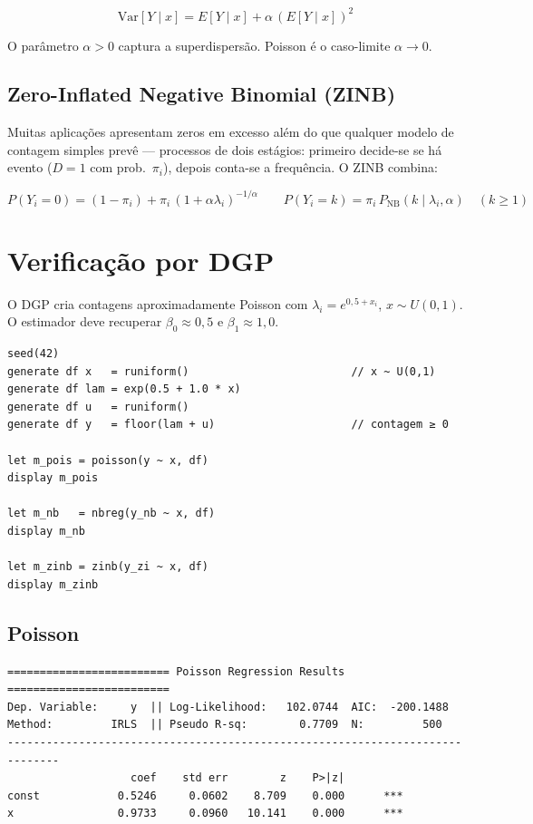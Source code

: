 \[
  \mathrm{Var}[Y \mid x] = E[Y\mid x] + \alpha\,(E[Y\mid x])^2
\]

O parâmetro $\alpha > 0$ captura a superdispersão. Poisson é o caso-limite
$\alpha \to 0$.

\subsection*{Zero-Inflated Negative Binomial (ZINB)}

Muitas aplicações apresentam zeros em excesso além do que qualquer modelo de
contagem simples prevê — processos de dois estágios: primeiro decide-se se há
evento ($D=1$ com prob.\ $\pi_i$), depois conta-se a frequência. O ZINB combina:

\[
  P(Y_i = 0) = (1-\pi_i) + \pi_i\,(1+\alpha\lambda_i)^{-1/\alpha}
  \qquad
  P(Y_i = k) = \pi_i\,P_{\mathrm{NB}}(k \mid \lambda_i,\alpha)\quad (k\geq 1)
\]

\section{Verificação por DGP}

O DGP cria contagens aproximadamente Poisson com $\lambda_i = e^{0{,}5 + x_i}$,
$x \sim U(0,1)$. O estimador deve recuperar $\beta_0 \approx 0{,}5$ e $\beta_1 \approx 1{,}0$.

\begin{lstlisting}[caption={Poisson, NegBin e ZINB}]
seed(42)
generate df x   = runiform()                         // x ~ U(0,1)
generate df lam = exp(0.5 + 1.0 * x)
generate df u   = runiform()
generate df y   = floor(lam + u)                     // contagem ≥ 0

let m_pois = poisson(y ~ x, df)
display m_pois

let m_nb   = nbreg(y_nb ~ x, df)
display m_nb

let m_zinb = zinb(y_zi ~ x, df)
display m_zinb
\end{lstlisting}

\subsection*{Poisson}

\begin{lstlisting}[language={}, basicstyle=\ttfamily\small,
  frame=none, numbers=none, backgroundcolor=\color{codbg},
  xleftmargin=0pt, xrightmargin=0pt, breaklines=false]
========================= Poisson Regression Results =========================
Dep. Variable:     y  || Log-Likelihood:   102.0744  AIC:  -200.1488
Method:         IRLS  || Pseudo R-sq:        0.7709  N:         500
------------------------------------------------------------------------------
                   coef    std err        z    P>|z|
const            0.5246     0.0602    8.709    0.000      ***
x                0.9733     0.0960   10.141    0.000      ***
\end{lstlisting}

